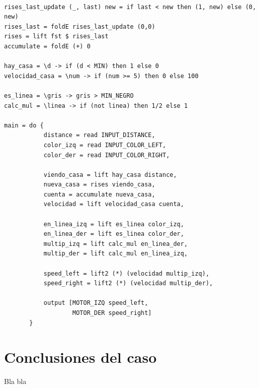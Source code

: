 \begin{verbatim}

rises_last_update (_, last) new = if last < new then (1, new) else (0, new)
rises_last = foldE rises_last_update (0,0)
rises = lift fst $ rises_last
accumulate = foldE (+) 0

hay_casa = \d -> if (d < MIN) then 1 else 0
velocidad_casa = \num -> if (num >= 5) then 0 else 100

es_linea = \gris -> gris > MIN_NEGRO
calc_mul = \linea -> if (not linea) then 1/2 else 1

main = do {
           distance = read INPUT_DISTANCE,
           color_izq = read INPUT_COLOR_LEFT,
           color_der = read INPUT_COLOR_RIGHT,

           viendo_casa = lift hay_casa distance,
           nueva_casa = rises viendo_casa,
           cuenta = accumulate nueva_casa,
           velocidad = lift velocidad_casa cuenta,

           en_linea_izq = lift es_linea color_izq,
           en_linea_der = lift es_linea color_der,
           multip_izq = lift calc_mul en_linea_der,
           multip_der = lift calc_mul en_linea_izq,

           speed_left = lift2 (*) (velocidad multip_izq),
           speed_right = lift2 (*) (velocidad multip_der),
        
           output [MOTOR_IZQ speed_left,
                   MOTOR_DER speed_right]
       }

\end{verbatim}

\section {Conclusiones del caso}

Bla bla

